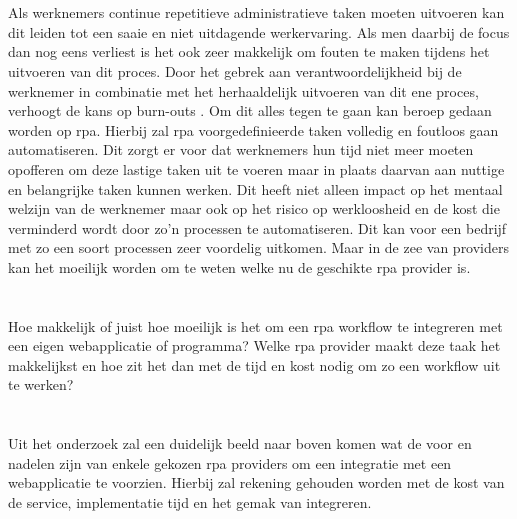\section{}
\label{sec:probleemstelling}
Als werknemers continue repetitieve administratieve taken moeten uitvoeren kan dit leiden tot een saaie en niet uitdagende werkervaring. Als men daarbij de focus dan nog eens verliest is het ook zeer makkelijk om fouten te maken tijdens het uitvoeren van dit proces. Door het gebrek aan verantwoordelijkheid bij de werknemer in combinatie met het herhaaldelijk uitvoeren van dit ene proces, verhoogt de kans op burn-outs \autocite{burnout}. Om dit alles tegen te gaan kan beroep gedaan worden op \acrlong{rpa}. Hierbij zal \acrshort{rpa} voorgedefinieerde taken volledig en foutloos gaan automatiseren. Dit zorgt er voor dat werknemers hun tijd niet meer moeten opofferen om deze lastige taken uit te voeren maar in plaats daarvan aan nuttige en belangrijke taken kunnen werken. Dit heeft niet alleen impact op het mentaal welzijn van de werknemer maar ook op het risico op werkloosheid en de kost die verminderd wordt door zo'n processen te automatiseren. Dit kan voor een bedrijf met zo een soort processen zeer voordelig uitkomen. Maar in de zee van providers kan het moeilijk worden om te weten welke nu de geschikte \acrshort{rpa} provider is.

\section{}
\label{sec:onderzoeksvraag}
Hoe makkelijk of juist hoe moeilijk is het om een \acrshort{rpa} \gls{workflow} te integreren met een eigen webapplicatie of programma? Welke \acrshort{rpa} provider maakt deze taak het makkelijkst en hoe zit het dan met de tijd en kost nodig om zo een \gls{workflow} uit te werken?


\section{}
\label{sec:onderzoeksdoelstelling}
Uit het onderzoek zal een duidelijk beeld naar boven komen wat de voor en nadelen zijn van enkele gekozen \acrshort{rpa} providers om een integratie met een webapplicatie te voorzien. Hierbij zal rekening gehouden worden met de kost van de service, implementatie tijd en het gemak van integreren.

